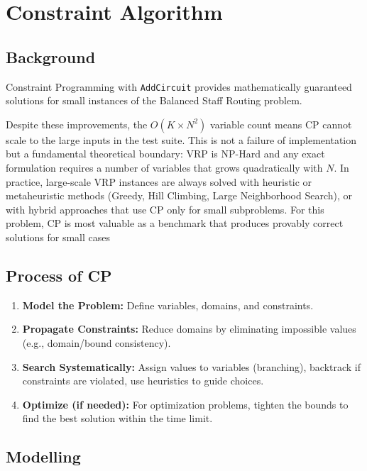 \documentclass[11pt]{article}
\begin{document}
\section{Constraint Algorithm}

\subsection{Background}
Constraint Programming with \texttt{AddCircuit} provides mathematically guaranteed solutions for small instances of the Balanced Staff Routing problem.

Despite these improvements, the $O(K \times N^2)$ variable count means CP cannot scale to the large inputs in the test suite. This is not a failure of implementation but a fundamental theoretical boundary: VRP is NP-Hard and any exact formulation requires a number of variables that grows quadratically with $N$. In practice, large-scale VRP instances are always solved with heuristic or metaheuristic methods (Greedy, Hill Climbing, Large Neighborhood Search), or with hybrid approaches that use CP only for small subproblems. For this problem, CP is most valuable as a benchmark that produces provably correct solutions for small cases


\subsection{Process of CP}
\begin{enumerate}
    \item \textbf{Model the Problem:} Define variables, domains, and constraints.
    \item \textbf{Propagate Constraints:} Reduce domains by eliminating impossible values (e.g., domain/bound consistency).
    \item \textbf{Search Systematically:} Assign values to variables (branching), backtrack if constraints are violated, use heuristics to guide choices.
    \item \textbf{Optimize (if needed):} For optimization problems, tighten the bounds to find the best solution within the time limit.
\end{enumerate}

\subsection{Modelling}
\end{document}
